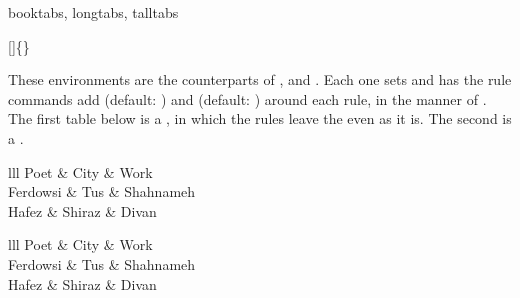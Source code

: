 \begin{codedescribe}[
    env,
    new=2021N,
    update=2022A
]{booktabs, longtabs, talltabs}
\begin{codesyntax}
[]\{\}
\end{codesyntax}
These environments are the counterparts of ,  and . Each one sets  and has the rule commands add \tsobj[code]{\aboverulesep} (default: \val{.4ex}) and \tsobj[code]{\belowrulesep} (default: \val{.65ex}) around each rule, in the manner of . The first table below is a , in which the rules leave the even  as it is. The second is a .

\begin{codestore}[st=lib:booktabs:env]
    \begin{tblr}{lll}
        \toprule
        Poet     & City   & Work      \\
        \midrule
        Ferdowsi & Tus    & Shahnameh \\
        Hafez    & Shiraz & Divan     \\
        \bottomrule
    \end{tblr}\quad
    \begin{booktabs}{lll}
        \toprule
        Poet     & City   & Work      \\
        \midrule
        Ferdowsi & Tus    & Shahnameh \\
        Hafez    & Shiraz & Divan     \\
        \bottomrule
    \end{booktabs}\end{codestore}
\begin{center}
\end{center}
\end{codedescribe}

